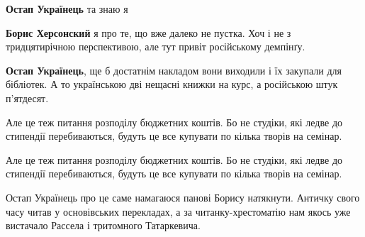 \begin{itemize}
\begin{itemize}
\textbf{Остап Українець} та знаю я

 

\textbf{Борис Херсонский} я про те, що вже далеко не пустка.
Хоч і не з тридцятирічною перспективою, але тут привіт російському демпінґу.

 
\textbf{Остап Українець}, ще б достатнім накладом вони виходили і їх закупали для бібліотек. А то українською дві нещасні книжки на курс, а російською штук п'ятдесят.

 

Але це теж питання розподілу бюджетних коштів. Бо не студіки, які ледве до
стипендії перебиваються, будуть це все купувати по кілька творів на семінар.

 

Але це теж питання розподілу бюджетних коштів. Бо не студіки, які ледве до
стипендії перебиваються, будуть це все купувати по кілька творів на семінар.


 

Остап Українець про це саме намагаюся панові Борису натякнути. Античку свого
часу читав у основівських перекладах, а за читанку-хрестоматію нам якось уже
вистачало Рассела і тритомного Татаркевича.


 


\end{itemize}
\end{itemize}
